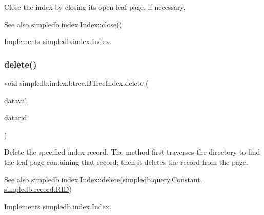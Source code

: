 Close the index by closing its open leaf page, if necessary. \begin{DoxySeeAlso}{See also}
\hyperlink{interfacesimpledb_1_1index_1_1Index_aedde7a12ff7788c1dc00ef9404b4266e}{simpledb.\+index.\+Index\+::close()} 
\end{DoxySeeAlso}


Implements \hyperlink{interfacesimpledb_1_1index_1_1Index_aedde7a12ff7788c1dc00ef9404b4266e}{simpledb.\+index.\+Index}.

\mbox{\label{classsimpledb_1_1index_1_1btree_1_1BTreeIndex_ae7be53ba321674d7300c2c67376a9859}} 
\subsubsection{\texorpdfstring{delete()}{delete()}}
{\footnotesize\ttfamily void simpledb.\+index.\+btree.\+B\+Tree\+Index.\+delete (\begin{DoxyParamCaption}\item[{\hyperlink{classsimpledb_1_1query_1_1Constant}{Constant}}]{dataval,  }\item[{\hyperlink{classsimpledb_1_1record_1_1RID}{R\+ID}}]{datarid }\end{DoxyParamCaption})\hspace{0.3cm}{\ttfamily [inline]}}

Delete the specified index record. The method first traverses the directory to find the leaf page containing that record; then it deletes the record from the page. \begin{DoxySeeAlso}{See also}
\hyperlink{interfacesimpledb_1_1index_1_1Index_a3bbe4098bf5422023391ce24f2e7df88}{simpledb.\+index.\+Index\+::delete}(\hyperlink{classsimpledb_1_1query_1_1Constant}{simpledb.\+query.\+Constant}, \hyperlink{classsimpledb_1_1record_1_1RID}{simpledb.\+record.\+R\+ID}) 
\end{DoxySeeAlso}


Implements \hyperlink{interfacesimpledb_1_1index_1_1Index_a3bbe4098bf5422023391ce24f2e7df88}{simpledb.\+index.\+Index}.

\mbox{\label{classsimpledb_1_1index_1_1btree_1_1BTreeIndex_a842091f8c02f9d3009f634c5c0635b4f}} 
